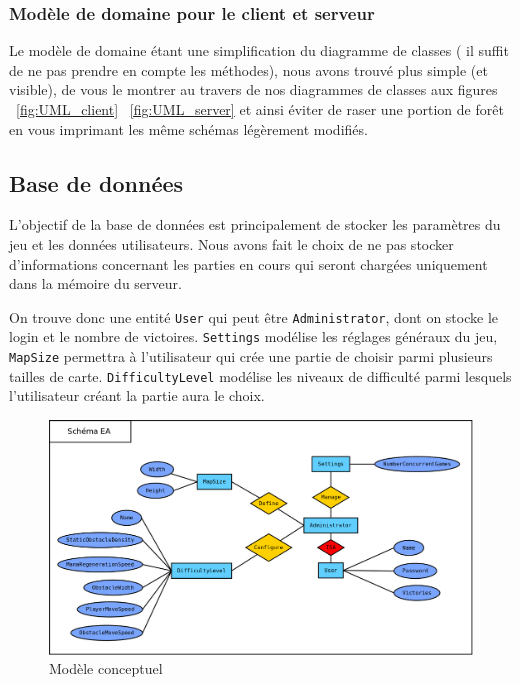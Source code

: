 \documentclass[a4paper,12pt]{article}
\begin{document}
	\subsubsection{Modèle de domaine pour le client et serveur}
	Le modèle de domaine étant une simplification du diagramme de classes ( il suffit de ne pas prendre en compte les méthodes), nous avons trouvé plus simple (et visible), de vous le montrer au travers de nos diagrammes de classes aux figures ~\ref{fig:UML_client} ~\ref{fig:UML_server} et ainsi éviter de raser une portion de forêt en vous imprimant les même schémas légèrement modifiés. 
	
	
	\subsection{Base de données}
	L'objectif de la base de données est principalement de stocker les paramètres du jeu et les données utilisateurs. Nous avons fait le choix de ne pas stocker d'informations concernant les parties en cours qui seront chargées uniquement dans la mémoire du serveur. \par
	
	On trouve donc une entité \texttt{User} qui peut être \texttt{Administrator}, dont on stocke le login et le nombre de victoires. \texttt{Settings} modélise les réglages généraux du jeu, \texttt{MapSize} permettra à l'utilisateur qui crée une partie de choisir parmi plusieurs tailles de carte. \texttt{DifficultyLevel} modélise les niveaux de difficulté parmi lesquels l'utilisateur créant la partie aura le choix.
	
	\begin{figure}[ht]
		\centering
		\includegraphics[width=\textwidth]{../Database/ER_diagram.png}
		\caption{Modèle conceptuel}
		\label{fig:database_er}
	\end{figure}
	
\end{document}
